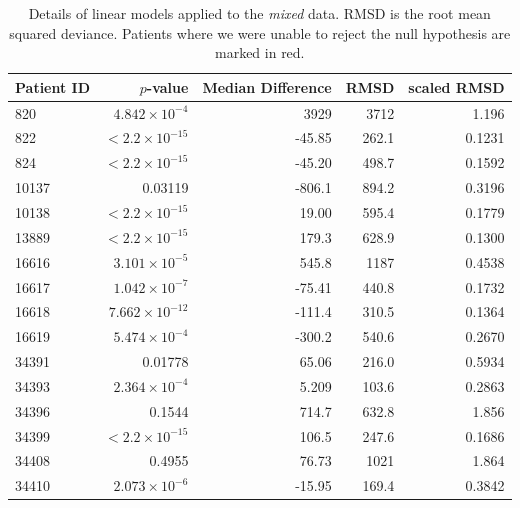 \documentclass[12pt]{article}
\newcommand{\badpat}[1]{\rowcolor{red}#1}
\begin{document}
\begin{table}[!ht]
\def\arraystretch{1.3}%
\begin{center}
\begin{tabular}{lrrrr} 
Patient ID & $p$-value & Median Difference & RMSD & scaled RMSD \\ 
\hline
820 & $4.842 \times 10^{-4}$ & 3929 & 3712 & 1.196 \\
822 & $< 2.2 \times 10^{-15}$ & -45.85 & 262.1 & 0.1231 \\
824 & $< 2.2 \times 10^{-15}$ & -45.20 & 498.7 & 0.1592 \\
\badpat{10137 & 0.03119 & -806.1 & 894.2 & 0.3196} \\
10138 & $< 2.2 \times 10^{-15}$ & 19.00 & 595.4 & 0.1779 \\
13889 & $< 2.2 \times 10^{-15}$ & 179.3 & 628.9 & 0.1300 \\
16616 & $3.101 \times 10^{-5}$ & 545.8 & 1187 & 0.4538 \\
16617 & $1.042 \times 10^{-7}$ & -75.41 & 440.8 & 0.1732 \\
16618 & $7.662 \times 10^{-12}$ & -111.4 & 310.5 & 0.1364 \\
16619 & $5.474 \times 10^{-4}$ & -300.2 & 540.6 & 0.2670 \\
\badpat{34391 & 0.01778 & 65.06 & 216.0 & 0.5934} \\
34393 & $2.364 \times 10^{-4}$ & 5.209 & 103.6 & 0.2863 \\
\badpat{34396 & 0.1544 & 714.7 & 632.8 & 1.856} \\
34399 & $< 2.2 \times 10^{-15}$ & 106.5 & 247.6 & 0.1686 \\
\badpat{34408 & 0.4955 & 76.73 & 1021 & 1.864} \\
34410 & $2.073 \times 10^{-6}$ & -15.95 & 169.4 & 0.3842 \\
\hline
\end{tabular}
\end{center}
  \caption{Details of linear models applied to the \emph{mixed} data. RMSD is the root mean squared deviance. Patients where we were unable to reject the null hypothesis are marked in red.
   }\label{tab:patientserror} 
\end{table}
\end{document}
